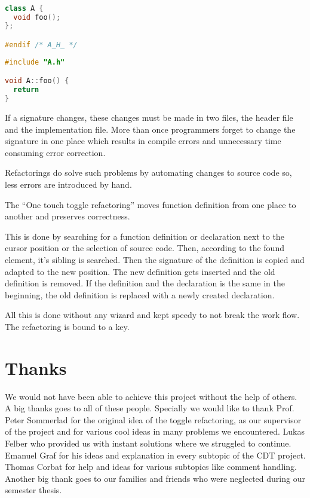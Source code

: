 \vspace{0.5cm}
\begin{minipage}{.48\textwidth}
\lstset{xrightmargin=0.5cm}
\begin{lstlisting}[caption={Header file containing declaration},
label={twofile1}, language=C++]

class A {
  void foo();
};

#endif /* A_H_ */
\end{lstlisting}
\end{minipage}%
\begin{minipage}{.48\textwidth}
\lstset{xleftmargin=0.5cm}
\begin{lstlisting}[caption={Source file containing definition},
label={twofile2}, language=C++ ]
#include "A.h"

void A::foo() {
  return
}
\end{lstlisting}
\end{minipage}

If a signature changes, these changes must be made in two files, the header file
and the implementation file. More than once programmers forget to change the
signature in one place which results in compile errors and unnecessary time
consuming error correction.\newline

Refactorings do solve such problems by automating changes to source code so,
less errors are introduced by hand.

The ``One touch toggle refactoring'' moves function definition from one place
to another and preserves correctness.

This is done by searching for a function definition or declaration next to the
cursor position or the selection of source code. Then, according to the found
element, it's sibling is searched. Then the signature of the definition is
copied and adapted to the new position. The new definition gets inserted and
the old definition is removed.
If the definition and the declaration is the same in the beginning, the old
definition is replaced with a newly created declaration.

All this is done without any wizard and kept speedy to not break the work flow.
The refactoring is bound to a key.
\thispagestyle{empty}
\pagebreak

\chapter*{Thanks}
We would not have been able to achieve this project without the help of others.
A big thanks goes to all of these people.\newline
Specially we would like to thank Prof. Peter Sommerlad for the original idea
of the toggle refactoring, as our supervisor of the project and for various cool
ideas in many problems we encountered. Lukas Felber who provided us with
instant solutions where we struggled to continue. Emanuel Graf for his ideas and
explanation in every subtopic of the CDT project. Thomas Corbat for help and
ideas for various subtopics like comment handling. \newline
Another big thank goes to our families and friends who were neglected during our
semester thesis.
\thispagestyle{empty}

